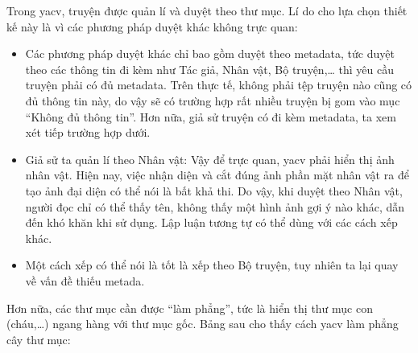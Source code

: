 \documentclass[../../thesis]{subfiles}
\begin{document}
Trong yacv, truyện được quản lí và duyệt theo thư mục. Lí do cho lựa chọn thiết
kế này là vì các phương pháp duyệt khác không trực quan:

\begin{itemize}
    \item
        Các phương pháp duyệt khác chỉ bao gồm duyệt theo metadata, tức duyệt
        theo các thông tin đi kèm như Tác giả, Nhân vật, Bộ truyện,\ldots{} thì
        yêu cầu truyện phải có đủ metadata. Trên thực tế, không phải tệp truyện
        nào cũng có đủ thông tin này, do vậy sẽ có trường hợp rất nhiều truyện
        bị gom vào mục ``Không đủ thông tin''. Hơn nữa, giả sử truyện có đi kèm
        metadata, ta xem xét tiếp trường hợp dưới.
    \item
        Giả sử ta quản lí theo Nhân vật: Vậy để trực quan, yacv phải hiển thị
        ảnh nhân vật. Hiện nay, việc nhận diện và cắt đúng ảnh phần mặt nhân vật
        ra để tạo ảnh đại diện có thể nói là bất khả thi. Do vậy, khi duyệt theo
        Nhân vật, người đọc chỉ có thể thấy tên, không thấy một hình ảnh gợi ý
        nào khác, dẫn đến khó khăn khi sử dụng. Lập luận tương tự có thể dùng
        với các cách xếp khác.
    \item
        Một cách xếp có thể nói là tốt là xếp theo Bộ truyện, tuy nhiên ta lại
        quay về vấn đề thiếu metada.
\end{itemize}

Hơn nữa, các thư mục cần được ``làm phẳng'', tức là hiển thị thư mục con
(cháu,\ldots) ngang hàng với thư mục gốc. Bảng sau cho thấy cách yacv làm phẳng
cây thư mục:

\end{document}
